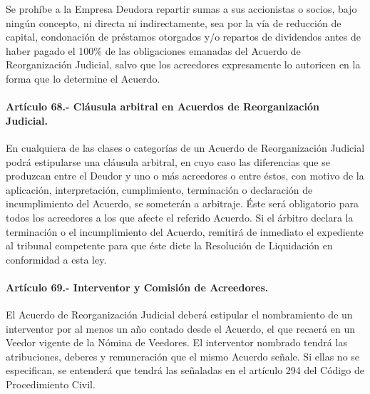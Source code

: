 \documentclass[
]{book}
\begin{document}
Se prohíbe a la Empresa Deudora repartir sumas a sus accionistas o socios, bajo ningún concepto, ni directa ni indirectamente, sea por la vía de reducción de capital, condonación de préstamos otorgados y/o repartos de dividendos antes de haber pagado el 100\% de las obligaciones emanadas del Acuerdo de Reorganización Judicial, salvo que los acreedores expresamente lo autoricen en la forma que lo determine el Acuerdo.

\hypertarget{artuxedculo-68.--cluxe1usula-arbitral-en-acuerdos-de-reorganizaciuxf3n-judicial.}{%
\paragraph*{Artículo 68.- Cláusula arbitral en Acuerdos de Reorganización Judicial.}\label{artuxedculo-68.--cluxe1usula-arbitral-en-acuerdos-de-reorganizaciuxf3n-judicial.}}

En cualquiera de las clases o categorías de un Acuerdo de Reorganización Judicial podrá estipularse una cláusula arbitral, en cuyo caso las diferencias que se produzcan entre el Deudor y uno o más acreedores o entre éstos, con motivo de la aplicación, interpretación, cumplimiento, terminación o declaración de incumplimiento del Acuerdo, se someterán a arbitraje. Éste será obligatorio para todos los acreedores a los que afecte el referido Acuerdo.
Si el árbitro declara la terminación o el incumplimiento del Acuerdo, remitirá de inmediato el expediente al tribunal competente para que éste dicte la Resolución de Liquidación en conformidad a esta ley.

\hypertarget{artuxedculo-69.--interventor-y-comisiuxf3n-de-acreedores.}{%
\paragraph*{Artículo 69.- Interventor y Comisión de Acreedores.}\label{artuxedculo-69.--interventor-y-comisiuxf3n-de-acreedores.}}

El Acuerdo de Reorganización Judicial deberá estipular el nombramiento de un interventor por al menos un año contado desde el Acuerdo, el que recaerá en un Veedor vigente de la Nómina de Veedores. El interventor nombrado tendrá las atribuciones, deberes y remuneración que el mismo Acuerdo señale. Si ellas no se especifican, se entenderá que tendrá las señaladas en el artículo 294 del Código de Procedimiento Civil.
\end{document}

